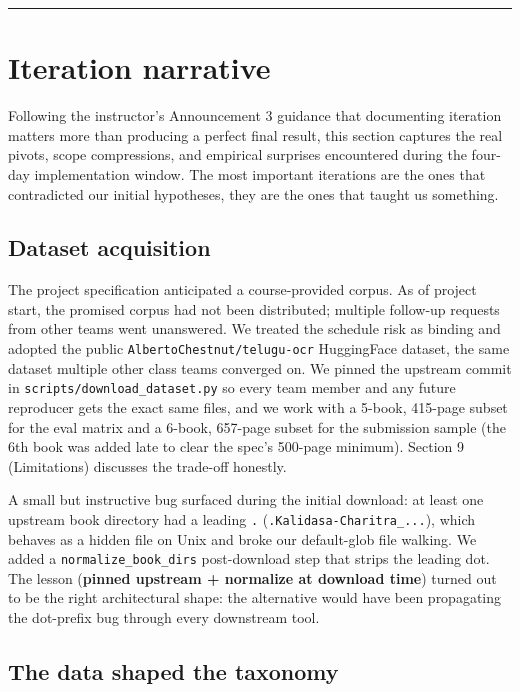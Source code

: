 \documentclass[
  letterpaper,
  DIV=11,
  numbers=noendperiod]{scrartcl}
\begin{document}
\begin{center}\rule{0.5\linewidth}{0.5pt}\end{center}

\section{Iteration narrative}\label{iteration-narrative}

Following the instructor's Announcement 3 guidance that documenting
iteration matters more than producing a perfect final result, this
section captures the real pivots, scope compressions, and empirical
surprises encountered during the four-day implementation window. The
most important iterations are the ones that contradicted our initial
hypotheses, they are the ones that taught us something.

\subsection{Dataset acquisition}\label{dataset-acquisition}

The project specification anticipated a course-provided corpus. As of
project start, the promised corpus had not been distributed; multiple
follow-up requests from other teams went unanswered. We treated the
schedule risk as binding and adopted the public
\texttt{AlbertoChestnut/telugu-ocr} HuggingFace dataset, the same
dataset multiple other class teams converged on. We pinned the upstream
commit in \texttt{scripts/download\_dataset.py} so every team member and
any future reproducer gets the exact same files, and we work with a
5-book, 415-page subset for the eval matrix and a 6-book, 657-page
subset for the submission sample (the 6th book was added late to clear
the spec's 500-page minimum). Section 9 (Limitations) discusses the
trade-off honestly.

A small but instructive bug surfaced during the initial download: at
least one upstream book directory had a leading \texttt{.}
(\texttt{.Kalidasa-Charitra\_...}), which behaves as a hidden file on
Unix and broke our default-glob file walking. We added a
\texttt{normalize\_book\_dirs} post-download step that strips the
leading dot. The lesson (\textbf{pinned upstream + normalize at download
time}) turned out to be the right architectural shape: the alternative
would have been propagating the dot-prefix bug through every downstream
tool.

\subsection{The data shaped the
taxonomy}\label{the-data-shaped-the-taxonomy}
\end{document}
